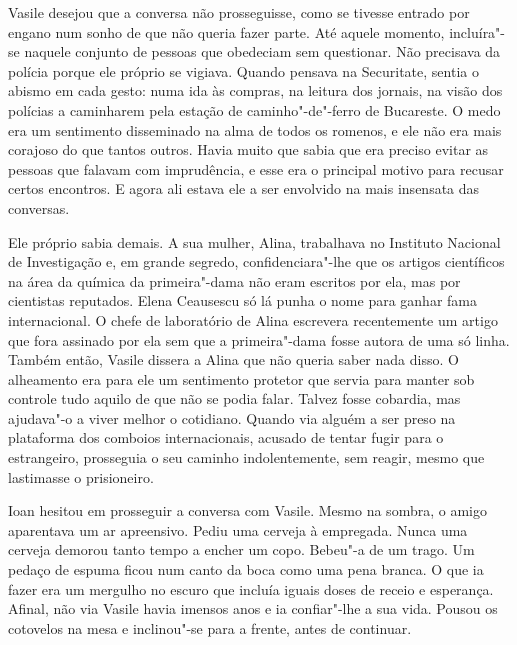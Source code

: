 Vasile desejou que a conversa não prosseguisse, como se tivesse entrado
por engano num sonho de que não queria fazer parte. Até aquele momento,
incluíra"-se naquele conjunto de pessoas que obedeciam sem questionar.
Não precisava da polícia porque ele próprio se vigiava. Quando pensava
na Securitate, sentia o abismo em cada gesto: numa ida às compras, na
leitura dos jornais, na visão dos polícias a caminharem pela estação de
caminho"-de"-ferro de Bucareste. O medo era um sentimento disseminado na
alma de todos os romenos, e ele não era mais corajoso do que tantos
outros. Havia muito que sabia que era preciso evitar as pessoas que
falavam com imprudência, e esse era o principal motivo para recusar
certos encontros. E agora ali estava ele a ser envolvido na mais
insensata das conversas.

Ele próprio sabia demais. A sua mulher, Alina, trabalhava no Instituto Nacional de Investigação e, em grande segredo,
confidenciara"-lhe que os artigos científicos na área da química da
primeira"-dama não eram escritos por ela, mas por cientistas reputados.
Elena Ceausescu só lá punha o nome para ganhar fama internacional. O
chefe de laboratório de Alina escrevera recentemente um artigo que
fora assinado por ela sem que a primeira"-dama fosse autora de uma só
linha. Também então, Vasile dissera a Alina que não queria saber nada
disso. O alheamento era para ele um sentimento protetor que servia para
manter sob controle tudo aquilo de que não se podia falar. Talvez fosse
cobardia, mas ajudava"-o a viver melhor o cotidiano. Quando via alguém
a ser preso na plataforma dos comboios internacionais, acusado de tentar
fugir para o estrangeiro, prosseguia o seu caminho indolentemente, sem
reagir, mesmo que lastimasse o prisioneiro.

Ioan hesitou em prosseguir a conversa com Vasile. Mesmo na sombra, o
amigo aparentava um ar apreensivo. Pediu uma cerveja à empregada. Nunca
uma cerveja demorou tanto tempo a encher um copo. Bebeu"-a de um trago.
Um pedaço de espuma ficou num canto da boca como uma pena branca. O que
ia fazer era um mergulho no escuro que incluía iguais doses de receio e
esperança. Afinal, não via Vasile havia imensos anos e ia confiar"-lhe a
sua vida. Pousou os cotovelos na mesa e inclinou"-se para a frente, antes
de continuar.

